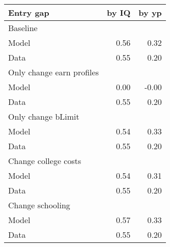 \begin{tabular}{lrr}
\hline
Entry gap & by IQ  & by yp  \\ 
\hline
Baseline &   &   \\ 
Model & 0.56  & 0.32  \\ 
Data & 0.55  & 0.20  \\ 
Only change earn profiles &   &   \\ 
Model & 0.00  & -0.00  \\ 
Data & 0.55  & 0.20  \\ 
Only change bLimit &   &   \\ 
Model & 0.54  & 0.33  \\ 
Data & 0.55  & 0.20  \\ 
Change college costs &   &   \\ 
Model & 0.54  & 0.31  \\ 
Data & 0.55  & 0.20  \\ 
Change schooling &   &   \\ 
Model & 0.57  & 0.33  \\ 
Data & 0.55  & 0.20  \\ 
\hline
\end{tabular}%
